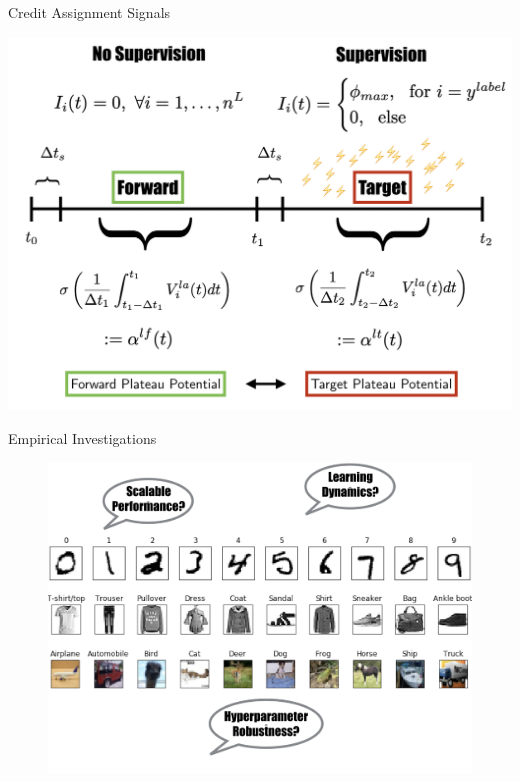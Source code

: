 \documentclass[dvipsnames, usenames]{beamer}
\begin{document}
\begin{frame}[noframenumbering]{Credit Assignment Signals}

\centering 
\includegraphics[width=1.025\textwidth]{../figures/report/phases_3}         

\end{frame}




\begin{frame}{Empirical Investigations}
	\begin{figure}
		\centering
		\includegraphics[width=\textwidth]{../figures/report/empirical_tests}
	\end{figure}
\end{frame}
\end{document}
